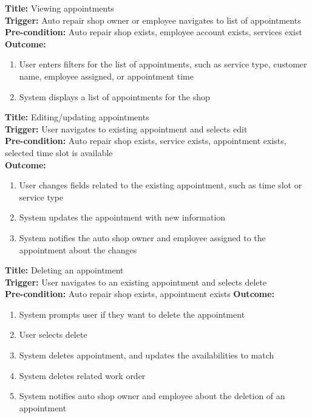 \documentclass[12pt]{article}
\begin{document}
\textbf{Title:} Viewing appointments\\
\textbf{Trigger:} Auto repair shop owner or employee navigates to list of appointments\\
\textbf{Pre-condition:} Auto repair shop exists, employee account exists, services exist\\
\textbf{Outcome:}
\begin{enumerate}
	\item User enters filters for the list of appointments, such as service type, customer name, employee
	      assigned, or appointment time
	\item System displays a list of appointments for the shop
\end{enumerate}

\textbf{Title:} Editing/updating appointments\\
\textbf{Trigger:} User navigates to existing appointment and selects edit\\
\textbf{Pre-condition:} Auto repair shop exists, service exists, appointment exists, selected time slot is available\\
\textbf{Outcome:}
\begin{enumerate}
	\item User changes fields related to the existing appointment, such as time slot or service type
	\item System updates the appointment with new information
	\item System notifies the auto shop owner and employee assigned to the appointment about the changes
\end{enumerate}

\textbf{Title:} Deleting an appointment\\
\textbf{Trigger:} User navigates to an existing appointment and selects delete\\
\textbf{Pre-condition:} Auto repair shop exists, appointment exists
\textbf{Outcome:}
\begin{enumerate}
	\item System prompts user if they want to delete the appointment
	\item User selects delete
	\item System deletes appointment, and updates the availabilities to match
	\item System deletes related work order
	\item System notifies auto shop owner and employee about the deletion of an appointment
\end{enumerate}
\end{document}
